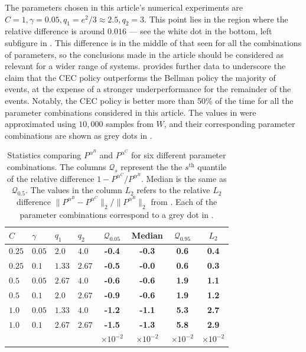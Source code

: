 \documentclass[main.tex]{subfiles}
\begin{document}
The parameters chosen in this article's numerical experiments
are $C=1,\gamma=0.05,q_1=e^2/3\approx2.5,q_2=3$. This point lies
in the region where the relative difference is around $0.016$ --- see the
white dot in the
bottom, left subfigure in .
This difference is in the middle of that seen for all the
combinations of parameters, so the conclusions made in the article
should be considered as relevant for a wider range of systems.
 provides further data to underscore
the claim that the CEC policy
outperforms the Bellman policy the
majority of events, at the expense of a stronger underperformance
for the remainder of the events. Notably, the CEC policy is better
more than 50\% of the time for all the parameter
combinations considered in this article. The values in
 were approximated using $10,000$ samples
from $W$, and their corresponding parameter combinations are shown as
grey dots in .

\begin{table}[htbp]
  \centering
  \begin{tabular}{llllcccc}
    $C$ & $\gamma$ & $q_1$ & $q_2$ & $\mathcal Q_{0.05}$
    &Median & $\mathcal Q_{0.95}$ &$L_2$\\
    \toprule
    $0.25$ & $0.05$ & $2.0$ & $4.0$  & \textbf{-0.4} & \textbf{-0.3} & \textbf{0.6} & \textbf{0.4}\\
    $0.25$ & $0.1$ & $1.33$ & $2.67$ & \textbf{-0.5} & \textbf{-0.0} & \textbf{0.6} & \textbf{0.3}\\
    $0.5$ & $0.05$ & $2.67$ & $4.0$  & \textbf{-0.6} & \textbf{-0.6} & \textbf{1.9} & \textbf{1.1}\\
    $0.5$ & $0.1$ & $2.0$ & $2.67$   & \textbf{-0.9} & \textbf{-0.6} & \textbf{1.9} & \textbf{1.2}\\
    $1.0$ & $0.05$ & $1.33$ & $4.0$  & \textbf{-1.2} & \textbf{-1.1} & \textbf{5.3} & \textbf{2.7}\\
    $1.0$ & $0.1$ & $2.67$ & $2.67$  & \textbf{-1.5} & \textbf{-1.3} & \textbf{5.8} & \textbf{2.9}\\
    &&&&$\times 10^{-2}$&$\times 10^{-2}$&$\times 10^{-2}$&$\times 10^{-2}$\\
    \bottomrule
  \end{tabular}
  \caption{Statistics comparing $P^{\alpha^B}$ and $P^{\alpha^C}$ for six different
    parameter combinations. The columns $\mathcal Q_s$ represent the
    the $s^{\text{th}}$ quantile of the relative
    difference
    $1-P^{\alpha^C}/P^{\alpha^B}$. Median is the same as $\mathcal Q_{0.5}$.
    The values in the column $L_2$ refers to the relative $L_2$
    difference $\|P^{\alpha^B}-P^{\alpha^C}\|_2/\|P^{\alpha^B}\|_2$
    from . Each of the parameter
    combinations correspond to a grey dot in .
  }\label{tbl:paramcomparisons}
\end{table}
\biblio
\end{document}
